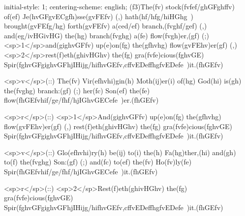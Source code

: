 initial-style: 1;
centering-scheme: english;
(f3)The(fv) stock(fvfef/ghGFghffv) of(ef) Je(hvGFgvECgfh)sse(gvFEfv) (,) hath(hf/hfg/hiHGhg~) brought(gvFEfg/hg) forth(gvFEfv) a(ced/ef) branch,(fvghf/gef) (,) and(eg/ivHGivHG) the(hg) branch(fvghg) a(fe) flow(fvgh)er,(gf) (;) <sp>1</sp>and(gighvGFfv) up(e)on(fg) the(gfhvhg) flow(gvFEhv)er(gf) (,) <sp>2</sp>rest(f)eth(ghivHGhv) the(fg) gra(fvfe)cious(fghvGE) Spir(fghvGFgighvGFhjIHijg/hifhvGEfv,cffvEDeffhgfvEDefe~)it.(fhGEfv)

<sp>v</sp>(::) The(fv) Vir(efhvhi)gin(h) Moth(ij)er(i) of(hg) God(hi) is(gh) the(fvghg) branch:(gf) (;) her(fc) Son(ef) the(fe) flow(fhGEfvhif/ge/fhf/hjIGhvGECefe~)er.(fhGEfv)

<sp>r</sp>(::) <sp>1</sp>And(gighvGFfv) up(e)on(fg) the(gfhvhg) flow(gvFEhv)er(gf) (,) rest(f)eth(ghivHGhv) the(fg) gra(fvfe)cious(fghvGE) Spir(fghvGFgighvGFhjIHijg/hifhvGEfv,cffvEDeffhgfvEDefe~)it.(fhGEfv)

<sp>v</sp>(::) Glo(efhvhi)ry(h) be(ij) to(i) the(h) Fa(hg)ther,(hi) and(gh) to(f) the(fvghg) Son:(gf) (;) and(fc) to(ef) the(fv) Ho(fv)ly(fe) Spir(fhGEfvhif/ge/fhf/hjIGhvGECefe~)it.(fhGEfv)

<sp>r</sp>(::) <sp>2</sp>Rest(f)eth(ghivHGhv) the(fg) gra(fvfe)cious(fghvGE) Spir(fghvGFgighvGFhjIHijg/hifhvGEfv,cffvEDeffhgfvEDefe~)it.(fhGEfv)